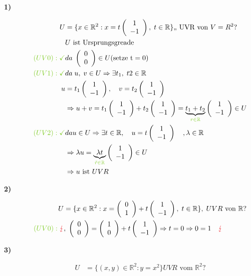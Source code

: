 \documentclass[12pt,a4paper]{article}%
\numberwithin{equation}{section}
\newcommand{\R}{\mathbb{R}} %
\def\colRed#1{\begingroup\color{Red}{#1}\endgroup}
\def\colGreen#1{\begingroup\color{LimeGreen}{#1}\endgroup}
\def\ubGreen#1#2{\underbrace{#2}_{\colGreen{#1}}}
\def\vecT#1{\left(\begin{array}{c} #1 \end{array}\right)}
\numberwithin{equation}{subsection}
\begin{document}
		  \begin{description}
		    \item[\textbf{1)}]
		    \begin{align*}
		      U &= \lbrace x \in \R^2 : x = t \vecT{1\\-1},\; t \in \R \rbrace \text{,, UVR von } V = R^2? \\
		      &U \text{ ist Ursprungsgreade} \\
		      \colGreen{(UV0): \checkmark} &da \; \vecT{0\\0} \in U (\text{setze t} = 0)\\
		      \colGreen{(UV1): \checkmark} &da \;u,\;v \in U \Rightarrow \exists t_1,\; t2 \in \R \\
		      u& = t_1 \vecT{1\\-1}, \quad v = t_2 \vecT{1\\-1}\\
		      &\Rightarrow u + v = t_1 \vecT{1\\-1} + t_2 \vecT{1\\-1} = \ubGreen{r \in \R}{t_1 + t_2} \vecT{1\\-1} \in U\\
		      \colGreen{(UV2): \checkmark} &da u \in U \Rightarrow \exists t \in \R, \quad u = t \vecT{1\\-1}\quad ,\lambda \in \R \\
		      &\Rightarrow \lambda u = \ubGreen{\tilde{r} \in \R}{\lambda t} \vecT{1\\-1} \in U \\
		      &\Rightarrow u \text{ ist }UVR
		    \end{align*}
		    \item[\textbf{2)}]
		    \begin{align*}
		      U &= \lbrace x \in \R^2: x = \vecT{0\\1} + t \vecT{1\\-1},\;t\in\R \rbrace ,\;UVR \text{ von } \R?\\
		      \colGreen{(UV0): }\; \colRed{\lightning}&,\; \vecT{0\\0} = \vecT{1\\0} + t \vecT{1\\-1} \Rightarrow t = 0 \Rightarrow 0 = 1 \quad \colRed{\lightning} \\
		    \end{align*}
		    \item[\textbf{3)}]
		    \begin{align*}
		      U &= \lbrace (x,y) \in \R^2 : y = x^2 \rbrace UVR \text{ vom } \R^2? \\

\end{align*}
\end{description}
\end{document}
